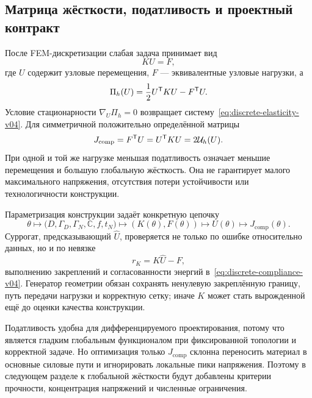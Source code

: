 \subsection{Матрица жёсткости, податливость и проектный контракт}

После FEM-дискретизации слабая задача принимает вид
\begin{equation}
\label{eq:discrete-elasticity-v04}
 K U=F,
\end{equation}
где $U$ содержит узловые перемещения, $F$ --- эквивалентные узловые нагрузки, а
\begin{equation}
\label{eq:discrete-potential-v04}
 \Pi_h(U)
 =\frac12U^{\mathsf{T}}KU-F^{\mathsf{T}}U.
\end{equation}
Условие стационарности $\nabla_U\Pi_h=0$ возвращает систему~\eqref{eq:discrete-elasticity-v04}. Для симметричной положительно определённой матрицы
\begin{equation}
\label{eq:discrete-compliance-v04}
 J_{\mathrm{comp}}
 =F^{\mathsf{T}}U
 =U^{\mathsf{T}}KU
 =2\mathcal U_h(U).
\end{equation}
При одной и той же нагрузке меньшая податливость означает меньшие перемещения и большую глобальную жёсткость. Она не гарантирует малого максимального напряжения, отсутствия потери устойчивости или технологичности конструкции.

\begin{mlconnection}
Параметризация конструкции задаёт конкретную цепочку
\begin{equation}
\label{eq:elastic-design-pipeline-v04}
 \theta
 \longmapsto
 \bigl(D,\Gamma_D,\Gamma_N,\mathbb C,f,t_N\bigr)
 \longmapsto
 (K(\theta),F(\theta))
 \longmapsto
 U(\theta)
 \longmapsto
 J_{\mathrm{comp}}(\theta).
\end{equation}
Суррогат, предсказывающий $\widehat U$, проверяется не только по ошибке относительно данных, но и по невязке
\[
 r_K=K\widehat U-F,
\]
выполнению закреплений и согласованности энергий в~\eqref{eq:discrete-compliance-v04}. Генератор геометрии обязан сохранять ненулевую закреплённую границу, путь передачи нагрузки и корректную сетку; иначе $K$ может стать вырожденной ещё до оценки качества конструкции.
\end{mlconnection}

Податливость удобна для дифференцируемого проектирования, потому что является гладким глобальным функционалом при фиксированной топологии и корректной задаче. Но оптимизация только $J_{\mathrm{comp}}$ склонна переносить материал в основные силовые пути и игнорировать локальные пики напряжения. Поэтому в следующем разделе к глобальной жёсткости будут добавлены критерии прочности, концентрация напряжений и численные ограничения.

